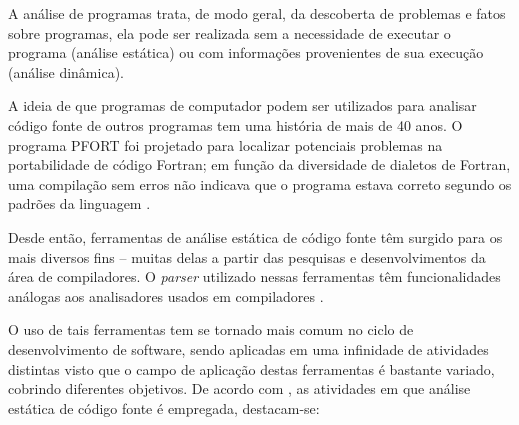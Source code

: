 A análise de programas trata, de modo geral, da descoberta de problemas e
fatos sobre programas, ela pode ser realizada sem a necessidade de executar o
programa (análise estática) ou com informações provenientes de sua execução
(análise dinâmica).

A ideia de que programas de computador podem ser utilizados para analisar
código fonte de outros programas tem uma história de mais de 40 anos.  O
programa PFORT \cite{Ryder1974} foi projetado para localizar potenciais
problemas na portabilidade de código Fortran; em função da diversidade de
dialetos de Fortran, uma compilação sem erros não indicava que o programa
estava correto segundo os padrões da linguagem \cite{Wichmann1995}.

Desde então, ferramentas de análise estática de código fonte têm surgido para
os mais diversos fins -- muitas delas a partir das pesquisas e
desenvolvimentos da área de compiladores.  O {\it parser} utilizado nessas
ferramentas têm funcionalidades análogas aos analisadores usados em
compiladores \cite{Anderson2008}.

O uso de tais ferramentas tem se
tornado mais comum no ciclo de desenvolvimento de
software, sendo aplicadas em uma infinidade de atividades distintas visto que o
campo de aplicação destas ferramentas é bastante variado, cobrindo diferentes
objetivos. De acordo com , as atividades em que análise
estática de código fonte é empregada, destacam-se:

